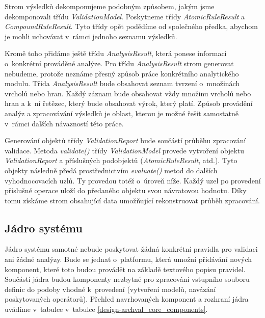 Strom výsledků dekomponujeme podobným způsobem, jakým jsme dekomponovali třídu \emph{ValidationModel}. Poskytneme třídy \emph{AtomicRuleResult} a \emph{CompoundRuleResult}. Tyto třídy opět podědíme od společného předka, abychom je mohli uchovávat v~rámci jednoho seznamu výsledků.

Kromě toho přidáme ještě třídu \emph{AnalysisResult}, která ponese informaci o~konkrétní prováděné analýze. Pro třídu \emph{AnalysisResult} strom generovat nebudeme, protože neznáme přesný způsob práce konkrétního analytického modulu. Třída \emph{AnalysisResult} bude obsahovat seznam tvrzení o~množinách vrcholů nebo hran. Každý záznam bude obsahovat vždy množinu vrcholů nebo hran a k~ní řetězec, který bude obsahovat výrok, který platí. Způsob provádění analýz a zpracovávání výsledků je oblast, kterou je možné řešit samostatně v~rámci dalších návazností této práce.

Generování objektů třídy \emph{ValidationReport} bude součástí průběhu zpracování validace. Metoda \emph{validate()} třídy \emph{ValidationModel} provede vytvoření objektu \emph{ValidationReport} a příslušných podobjektů (\emph{AtomicRuleResult}, atd.). Tyto objekty následně předá prostřednictvím \emph{evaluate()} metod do dalších vyhodnocovacích uzlů. Ty provedou totéž o~úroveň níže. Každý uzel po provedení příslušné operace uloží do předaného objektu svou návratovou hodnotu. Díky tomu získáme strom obsahující data umožňující rekonstruovat průběh zpracování.



\subsection{Jádro systému}
Jádro systému samotné nebude poskytovat žádná konkrétní pravidla pro validaci ani žádné analýzy. Bude se jednat o~platformu, která umožní přidávání nových komponent, které toto budou provádět na základě textového popisu pravidel. Součástí jádra budou komponenty nezbytné pro zpracování vstupního souboru definic do podoby vhodné k~provedení (vytvoření modelů, navázání poskytovaných operátorů). Přehled navrhovaných komponent a rozhraní jádra uvádíme v~tabulce v~tabulce \ref{design-archval_core_components}.

